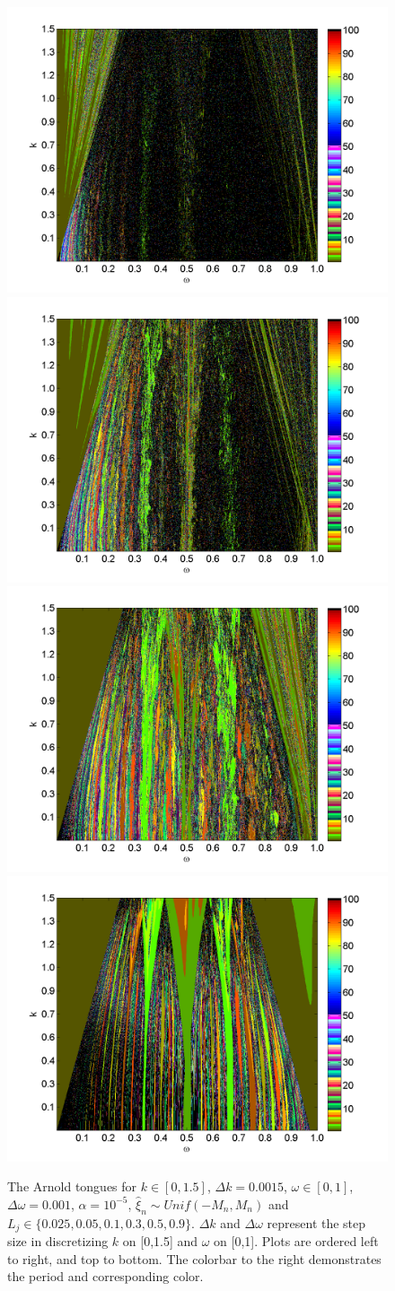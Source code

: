 \begin{figure}[H]\linespread{1}  
\caption[The Arnold tongues for the random circle map, uniform
distribution, $\alpha = \frac{1}{2}10^{-5}$]{The Arnold
  tongues for $k\in [0,1.5]$, $\Delta k = 0.0015$, $\omega \in [0,1]$,
  $\Delta \omega = 0.001$, $\alpha = 10^{-5}$, $\hat{\xi}_n\sim Unif(-M_n,M_n)$ and $L_j \in
  \{0.025,0.05,0.1,0.3,0.5,0.9\}$. $\Delta k$ and $\Delta \omega$
  represent the step size in discretizing $k$ on [0,1.5] and $\omega$
  on [0,1]. Plots are ordered left to right,
  and top to bottom. The colorbar to the right demonstrates the period and corresponding color.}\label{fig:rcirctongues_u_ha}
\centering
\includegraphics[width=.5\textwidth]{figs/tongues_u_halfa_1000_L_0025.png}\hfill
\includegraphics[width=.5\textwidth]{figs/tongues_u_halfa_1000_L_005.png}\\
\includegraphics[width=.5\textwidth]{figs/tongues_u_halfa_1000_L_01.png}\hfill
\includegraphics[width=.5\textwidth]{figs/tongues_u_halfa_1000_L_03.png}\\

\end{figure}
